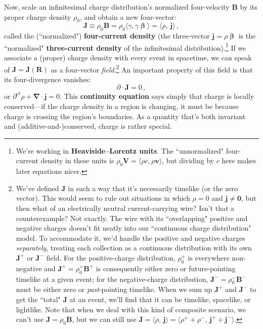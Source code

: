 \documentclass[12pt]{article}
\renewcommand{\vv}[1]{\mathbf{#1}}
\newcommand{\vvbeta}{\bm{\upbeta}}
\newcommand{\del}{\boldsymbol{\nabla}}
\begin{document}
Now, scale an infinitesimal charge distribution's normalized four-velocity $\vv B$ by its proper charge density $\rho_0$, and obtain a new four-vector:
\begin{equation}\label{eq:fc}
\boxed{ \vv J \equiv \rho_0 \vv B = \rho_0 \langle \gamma , \gamma \vvbeta \rangle = \langle \rho, \, \vv j \rangle } \, ,
\end{equation}
called the (``normalized") \textbf{four-current density} (the three-vector $\vv j = \rho \vvbeta$ is the ``normalized" \textbf{three-current density} of the infinitesimal distribution).\footnote{We're working in \textbf{Heaviside--Lorentz units}. The ``unnormalized" four-current density in these units is $\rho_0 \vv V = \langle \rho c, \rho \vv v \rangle$, but dividing by $c$ here makes later equations nicer.} If we associate a (proper) charge density with every event in spacetime, we can speak of $\vv J = \vv J (\vv R)$ as a four-vector \emph{field}.\footnote{We've defined $\vv J$ in such a way that it's necessarily timelike (or the zero vector). This would seem to rule out situations in which $\rho = 0$ and $\vv j \neq \vv 0$, but then what of an electrically neutral current-carrying wire? Isn't that a counterexample? Not exactly. The wire with its ``overlapping" positive and negative charges doesn't fit neatly into our ``continuous charge distribution" model. To accommodate it, we'd handle the positive and negative charges \emph{separately}, treating each collection as a continuous distribution with its own $\vv J^+$ or $\vv J^-$ field. For the positive-charge distribution, $\rho_0^+$ is everywhere non-negative and $\vv J^+ = \rho_0^+ \vv B^+$ is consequently either zero or future-pointing timelike at a given event; for the negative-charge distribution, $\vv J^- = \rho_0^- \vv B^-$ must be either zero or \emph{past}-pointing timelike. When we sum up $\vv J^+$ and $\vv J^-$ to get the ``total" $\vv J$ at an event, we'll find that it can be timelike, spacelike, or lightlike. Note that when we deal with this kind of composite scenario, we can't use $\vv J = \rho_0 \vv B$, but we can still use $\vv J = \langle \rho, \, \vv j \rangle = \langle \rho^+ + \rho^- , \, \vv j^+ + \vv j^- \rangle $.} An important property of this field is that its four-divergence vanishes:
\begin{equation}\label{eq:con}
\boxed{\partialup \cdot \vv J = 0} \, ,
\end{equation}
or $\partial^{ct} \rho + \del \cdot \vv j = 0$. This \textbf{continuity equation} says simply that charge is locally conserved---if the charge density in a region is changing, it must be because charge is crossing the region's boundaries. As a quantity that's both invariant and (additive-and-)conserved, charge is rather special.
\end{document}
